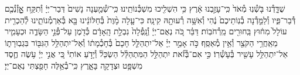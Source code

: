 \documentclass[twoside, openany, parskip=half, 11pt]{book}
\begin{document}
שֻׁדָּ֑דְ֯נוּ בֹּ֤שְׁ֯נֽוּ מְ֯אֹד֙ כִּֽי־עָזַ֣בְנוּ אָ֔רֶץ כִּ֥י הִשְׁלִ֖יכוּ מִשְׁכְּ֯נוֹתֵֽינוּ׃ כִּֽי־שְׁ֯מַ֤עְנָה נָשִׁים֙ דְּבַר־יְיָ֔ וְ֯תִקַּ֥ח אׇׇׇׇׇזְ֯נְ֯כֶ֖ם דְּ֯בַר־פִּ֑יו וְ֯לַמֵּ֤דְ֯נָה בְ֯נֽוֹתֵיכֶם֙ נֶ֔הִי וְ֯אִשָּׁ֥ה רְ֯עוּתָ֖הּ קִינָֽה׃ כִּי־עָ֤לָה מָ֨וֶת֙ בְּ֯חַלּוֹנֵ֔ינוּ בָּ֖א בְּ֯אַרְמְ֯נוֹתֵ֑ינוּ לְ֯הַכְרִ֤ית עוֹלָל֙ מִח֔וּץ בַּֽחוּרִ֖ים מֵֽרְ֯חֹבֽוֹת׃ דַּבֵּ֗ר כֹּ֚ה נְאֻם־יְיָ֔ וְ֯נָֽפְ֯לָה֙ נִבְלַ֣ת הָֽאָדָ֔ם כְּ֯דֹ֖מֶן עַל־פְּ֯נֵ֣י הַשָּׂדֶ֑ה וּכְעָמִ֛יר מֵאַֽחֲרֵ֥י הַקֹּצֵ֖ר וְ֯אֵ֥ין מְ֯אַסֵּֽף׃ כֹּ֣ה אָמַ֣ר יְיָ֗ אַל־יִתְהַלֵּ֤ל חָכָם֙ בְּ֯חָכְ֯מָת֔וֹ וְ֯אַל־יִתְהַלֵּ֥ל הַגִּבּ֖וֹר בִּגְבֽוּרָת֑וֹ אַל־יִתְהַלֵּ֥ל עָשִׁ֖יר בְּ֯עָשְׁ֯רֽוֹ׃ כִּ֣י אִם־בְּ֯זֹ֞את יִתְהַלֵּ֣ל הַמִּתְהַלֵּ֗ל הַשְׂכֵּל֘ וְ֯יָדֹ֣עַ אוֹתִי֒ כִּ֚י אֲנִ֣י יְיָ֔ עֹ֥שֶׂה חֶ֛סֶד מִשְׁפָּ֥ט וּצְדָקָ֖ה בָּאָ֑רֶץ כִּֽי־בְ֯אֵ֥לֶּה חָפַ֖צְתִּי נְאֻם־יְיָ׃
%
%
%
%
\end{document}
